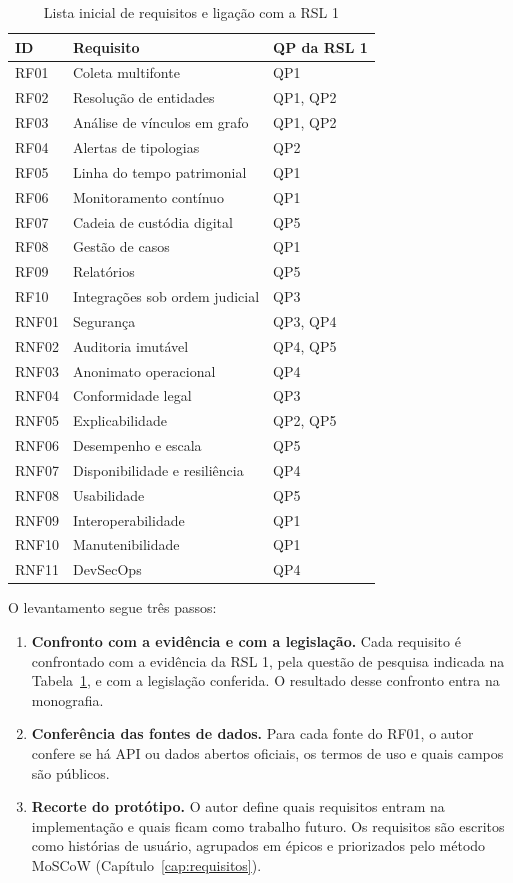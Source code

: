 \begin{table}[htbp]
	\centering
	\caption{Lista inicial de requisitos e ligação com a RSL 1}
	\label{tab:requisitos}
	\small
	\begin{tabular}{p{1.4cm}p{9.6cm}p{2.6cm}}
		\hline
		\textbf{ID} & \textbf{Requisito} & \textbf{QP da RSL 1} \\
		\hline
		RF01 & Coleta multifonte & QP1 \\
		RF02 & Resolução de entidades & QP1, QP2 \\
		RF03 & Análise de vínculos em grafo & QP1, QP2 \\
		RF04 & Alertas de tipologias & QP2 \\
		RF05 & Linha do tempo patrimonial & QP1 \\
		RF06 & Monitoramento contínuo & QP1 \\
		RF07 & Cadeia de custódia digital & QP5 \\
		RF08 & Gestão de casos & QP1 \\
		RF09 & Relatórios & QP5 \\
		RF10 & Integrações sob ordem judicial & QP3 \\
		\hline
		RNF01 & Segurança & QP3, QP4 \\
		RNF02 & Auditoria imutável & QP4, QP5 \\
		RNF03 & Anonimato operacional & QP4 \\
		RNF04 & Conformidade legal & QP3 \\
		RNF05 & Explicabilidade & QP2, QP5 \\
		RNF06 & Desempenho e escala & QP5 \\
		RNF07 & Disponibilidade e resiliência & QP4 \\
		RNF08 & Usabilidade & QP5 \\
		RNF09 & Interoperabilidade & QP1 \\
		RNF10 & Manutenibilidade & QP1 \\
		RNF11 & DevSecOps & QP4 \\
		\hline
	\end{tabular}
\end{table}

O levantamento segue três passos:

\begin{enumerate}
	\item \textbf{Confronto com a evidência e com a legislação.} Cada requisito
	é confrontado com a evidência da RSL 1, pela questão de pesquisa indicada
	na Tabela~\ref{tab:requisitos}, e com a legislação conferida. O resultado
	desse confronto entra na monografia.
	\item \textbf{Conferência das fontes de dados.} Para cada fonte do RF01, o
	autor confere se há API ou dados abertos oficiais, os termos de uso e quais
	campos são públicos.
	\item \textbf{Recorte do protótipo.} O autor define quais requisitos entram
	na implementação e quais ficam como trabalho futuro. Os requisitos são
	escritos como histórias de usuário, agrupados em épicos e priorizados pelo
	método MoSCoW (Capítulo~\ref{cap:requisitos}).
\end{enumerate}

